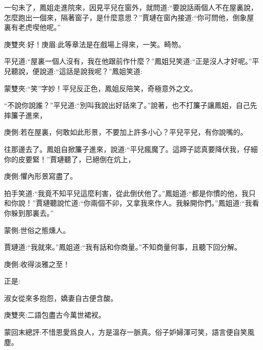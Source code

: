 \begin{parag}
    一句未了，鳳姐走進院來，因見平兒在窗外，就問道:“要說話兩個人不在屋裏說，怎麼跑出一個來，隔著窗子，是什麼意思？”賈璉在窗內接道:“你可問他，倒象屋裏有老虎喫他呢。”\begin{note}庚雙夾:好！庚眉:此等章法是在戲場上得來，一笑。畸笏。\end{note}平兒道:“屋裏一個人沒有，我在他跟前作什麼？”鳳姐兒笑道:“正是沒人才好呢。”平兒聽說，便說道:“這話是說我呢？”鳳姐笑道:\begin{note}蒙雙夾:“笑”字妙！平兒反正色，鳳姐反陪笑，奇極意外之文。\end{note}“不說你說誰？”平兒道:“別叫我說出好話來了。”說著，也不打簾子讓鳳姐，自己先摔簾子進來，\begin{note}庚側:若在屋裏，何敢如此形景，不要加上許多小心？平兒平兒，有你說嘴的。\end{note}往那邊去了。鳳姐自掀簾子進來，說道:“平兒瘋魔了。這蹄子認真要降伏我，仔細你的皮要緊！”賈璉聽了，已絕倒在炕上，\begin{note}庚側:懼內形景寫盡了。\end{note}拍手笑道:“我竟不知平兒這麼利害，從此倒伏他了。”鳳姐道:“都是你慣的他，我只和你說！”賈璉聽說忙道:“你兩個不卯，又拿我來作人。我躲開你們。”鳳姐道:“我看你躲到那裏去。”\begin{note}蒙側:世俗之態燻人。\end{note}賈璉道:“我就來。”鳳姐道:“我有話和你商量。”不知商量何事，且聽下回分解。\begin{note}庚側:收得淡雅之至！\end{note}正是:
\end{parag}


\begin{poem}
    \begin{pl}淑女從來多抱怨，嬌妻自古便含酸。\end{pl}
    \begin{note}庚雙夾:二語包盡古今萬世裙衩。\end{note}
\end{poem}


\begin{parag}
    \begin{note}蒙回末總評:不惜恩愛爲良人，方是溫存一脈真。俗子妒婦渾可笑，語言便自笑風塵。\end{note}
\end{parag}
